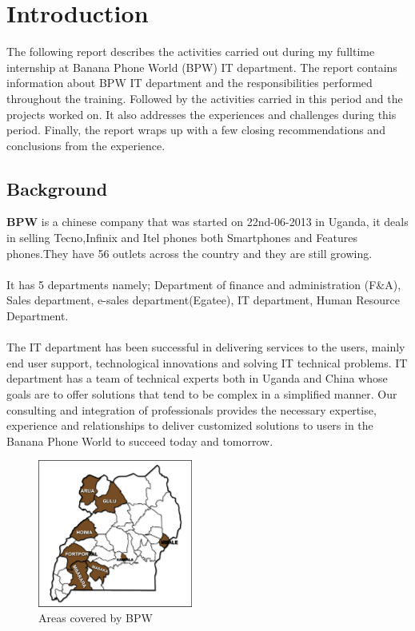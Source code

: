 \chapter{Introduction}
The following report describes the activities carried out during my full­time internship at Banana Phone World (BPW) IT department. The report contains information about BPW IT department and the responsibilities performed throughout the training. Followed by the activities carried in this period and the projects worked on. It also addresses the experiences and challenges during this period. Finally, the report wraps up with a few closing recommendations and conclusions from the experience. 	

\section{Background}
\normalsize{\bf BPW} is a chinese company that was started on 22nd-06-2013 in Uganda, it deals in selling Tecno,Infinix and Itel phones both Smartphones and Features phones.They have 56 outlets across the country and they are still growing.\\ \\
It has 5 departments namely; Department of finance and administration (F\&A), Sales department, e-sales department(Egatee), IT department, Human Resource Department.\\ \\
The IT department has been successful in delivering services to the users, mainly end user support, technological innovations and solving IT technical problems. IT department has a team of technical experts both in Uganda and China whose goals are to offer solutions that tend to be complex in a simplified manner. Our consulting and integration of professionals provides the necessary expertise, experience and relationships to deliver customized solutions to users in the Banana Phone World to succeed today and tomorrow.

\begin{figure}
\centering
\includegraphics[width=2in]{img/Map}
\caption{Areas covered by BPW}
\end{figure}

